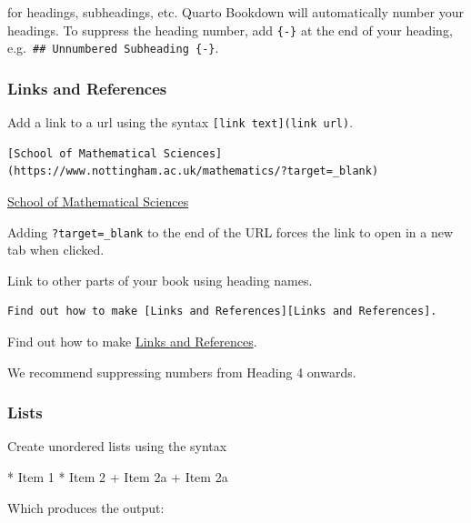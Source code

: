 \documentclass[
  letterpaper,
  oneside]{book}
\newenvironment{Shaded}{\begin{snugshade}}{\end{snugshade}}
\newcommand{\NormalTok}[1]{\textcolor[rgb]{0.00,0.23,0.31}{#1}}
\newcommand{\SpecialStringTok}[1]{\textcolor[rgb]{0.13,0.47,0.30}{#1}}
\numberwithin{equation}{section}
\numberwithin{figure}{section}
\theoremstyle{break}
\theoremstyle{plain}
\theoremstyle{remark}
\begin{document}
for headings, subheadings, etc. Quarto Bookdown will automatically
number your headings. To suppress the heading number, add \texttt{\{-\}}
at the end of your heading,
e.g.~\texttt{\#\#\ Unnumbered\ Subheading\ \{-\}}.

\subsubsection*{Links and References}\label{links-and-references}

Add a link to a url using the syntax
\texttt{{[}link\ text{]}(link\ url)}.

\begin{verbatim}
[School of Mathematical Sciences](https://www.nottingham.ac.uk/mathematics/?target=_blank)
\end{verbatim}

\href{https://www.nottingham.ac.uk/mathematics/?target=_blank}{School of
Mathematical Sciences}

Adding \texttt{?target=\_blank} to the end of the URL forces the link to
open in a new tab when clicked.

Link to other parts of your book using heading names.

\begin{verbatim}
Find out how to make [Links and References][Links and References].
\end{verbatim}

Find out how to make \hyperref[links-and-references]{Links and
References}.

We recommend suppressing numbers from Heading 4 onwards.

\subsubsection*{Lists}\label{lists}

Create unordered lists using the syntax

\begin{Shaded}
\begin{Highlighting}[]
\SpecialStringTok{* }\NormalTok{Item 1}
\SpecialStringTok{* }\NormalTok{Item 2}
\SpecialStringTok{    + }\NormalTok{Item 2a}
\SpecialStringTok{    + }\NormalTok{Item 2a}
\end{Highlighting}
\end{Shaded}

Which produces the output:
\end{document}
